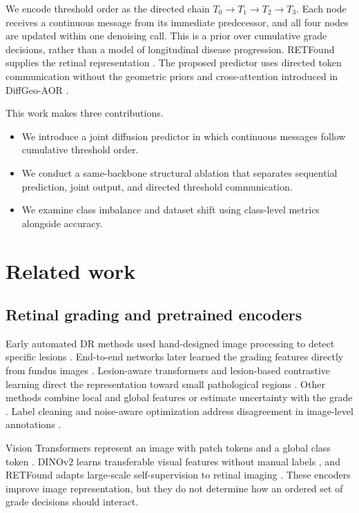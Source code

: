 \documentclass[a4paper,fleqn]{cas-sc}
\begin{document}
We encode threshold order as the directed chain $T_0\rightarrow T_1\rightarrow T_2\rightarrow T_3$. Each node receives a continuous message from its immediate predecessor, and all four nodes are updated within one denoising call. This is a prior over cumulative grade decisions, rather than a model of longitudinal disease progression. RETFound supplies the retinal representation \citep{zhou2023retfound}. The proposed predictor uses directed token communication without the geometric priors and cross-attention introduced in DiffGeo-AOR \citep{yu2026diffgeo}.

This work makes three contributions.
\begin{itemize}
  \item We introduce a joint diffusion predictor in which continuous messages follow cumulative threshold order.
  \item We conduct a same-backbone structural ablation that separates sequential prediction, joint output, and directed threshold communication.
  \item We examine class imbalance and dataset shift using class-level metrics alongside accuracy.
\end{itemize}

\section{Related work}
\label{sec:related}

\subsection{Retinal grading and pretrained encoders}

Early automated DR methods used hand-designed image processing to detect specific lesions \citep{winder2009}. End-to-end networks later learned the grading features directly from fundus images \citep{gulshan2016,ting2017}. Lesion-aware transformers and lesion-based contrastive learning direct the representation toward small pathological regions \citep{sun2021lat,huang2021lesioncl}. Other methods combine local and global features or estimate uncertainty with the grade \citep{araujo2020drgraduate,huang2025drctfn}. Label cleaning and noise-aware optimization address disagreement in image-level annotations \citep{hu2023noisy}.

Vision Transformers represent an image with patch tokens and a global class token \citep{dosovitskiy2021vit}. DINOv2 learns transferable visual features without manual labels \citep{oquab2024dinov2}, and RETFound adapts large-scale self-supervision to retinal imaging \citep{zhou2023retfound}. These encoders improve image representation, but they do not determine how an ordered set of grade decisions should interact.
\end{document}
